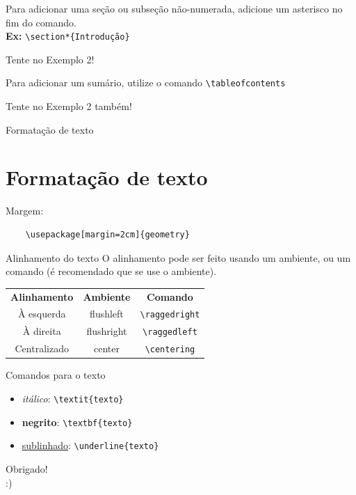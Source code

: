 \documentclass[12pt]{beamer}
\begin{document}
\begin{frame}[fragile]
  Para adicionar uma seção ou subseção não-numerada, adicione um asterisco no fim do comando.\\
  \medskip
  \textbf{Ex:} \verb+\section*{Introdução}+
  \medskip

  Tente no Exemplo 2!
\end{frame}

\begin{frame}[fragile]
  Para adicionar um sumário, utilize o comando \verb+\tableofcontents+
  \bigskip

  Tente no Exemplo 2 também!
\end{frame}

\begin{frame}[fragile]{Formatação de texto}
  \section{Formatação de texto}

  Margem:\\
  \begin{verbatim}
    \usepackage[margin=2cm]{geometry}
  \end{verbatim}
\end{frame}

\begin{frame}[fragile]{Alinhamento do texto}
  O alinhamento pode ser feito usando um ambiente, ou um comando (é recomendado que se use o ambiente).
  \begin{center}
    \begin{tabular}{ccc}
    \textbf{Alinhamento} & \textbf{Ambiente} & \textbf{Comando}\\
    À esquerda & flushleft & \verb+\raggedright+\\
    À direita & flushright & \verb+\raggedleft+\\
    Centralizado & center & \verb+\centering+\\
    \end{tabular}
  \end{center}
\end{frame}

\begin{frame}[fragile]{Comandos para o texto}
  \begin{itemize}
    \item \textit{itálico}: \verb+\textit{texto}+
    \item \textbf{negrito}: \verb+\textbf{texto}+
    \item \underline{sublinhado}: \verb+\underline{texto}+
  \end{itemize}
\end{frame}

\begin{frame}
  \begin{center}
    \large Obrigado!\\
    :)
  \end{center}
\end{frame}
\end{document}
